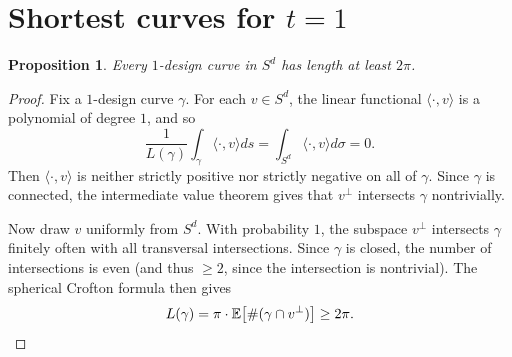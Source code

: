 \documentclass[12pt]{article}
\theoremstyle{plain}
\newtheorem{prop}[thm]{Proposition}
\theoremstyle{definition}
\theoremstyle{remark}
\begin{document}
\appendix

\section{Shortest curves for $t=1$}\label{app:app}

\begin{prop}
Every $1$-design curve in $S^d$ has length at least $2\pi$.
\end{prop}

\begin{proof}
Fix a $1$-design curve $\gamma$.
For each $v\in S^d$, the linear functional $\langle \cdot,v\rangle$ is a polynomial of degree $1$, and so
\[
\frac{1}{L(\gamma)}\int_\gamma \langle \cdot,v\rangle ds=\int_{S^d}\langle \cdot,v\rangle d\sigma
=0.
\]
Then $\langle\cdot,v\rangle$ is neither strictly positive nor strictly negative on all of $\gamma$.
Since $\gamma$ is connected, the intermediate value theorem gives that $v^\perp$ intersects $\gamma$ nontrivially.

Now draw $v$ uniformly from $S^d$.
With probability $1$, the subspace $v^\perp$ intersects $\gamma$ finitely often with all transversal intersections.
Since $\gamma$ is closed, the number of intersections is even (and thus $\geq2$, since the intersection is nontrivial).
The spherical Crofton formula then gives
\[
L(\gamma)
=\pi\cdot\mathbb{E}\big[\#(\gamma\cap v^\perp)\big]
\geq2\pi.
\qedhere
\]
\end{proof}
\end{document}
